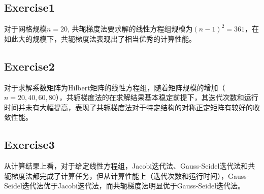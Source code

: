 \documentclass{article}
\begin{document}
\subsection*{Exercise1}

对于网格规模$n=20$, 共轭梯度法要求解的线性方程组规模为$(n-1)^2=361$，在如此大的规模下，共轭梯度法表现出了相当优秀的计算性能。

\subsection*{Exercise2}

对于求解系数矩阵为Hilbert矩阵的线性方程组，随着矩阵规模的增加（$n=20,40,60,80$），共轭梯度法的在求解结果基本稳定前提下，其迭代次数和运行时间并未有大幅提高，表现了共轭梯度法对于特定结构的对称正定矩阵有较好的收敛性能。

\subsection*{Exercise3}

从计算结果上看，对于给定线性方程组，Jacobi迭代法、Gauss-Seidel迭代法和共轭梯度法都完成了计算任务，但从计算性能上（迭代次数和运行时间），Gauss-Seidel迭代法优于Jacobi迭代法，而共轭梯度法明显优于Gauss-Seidel迭代法。
\end{document}
